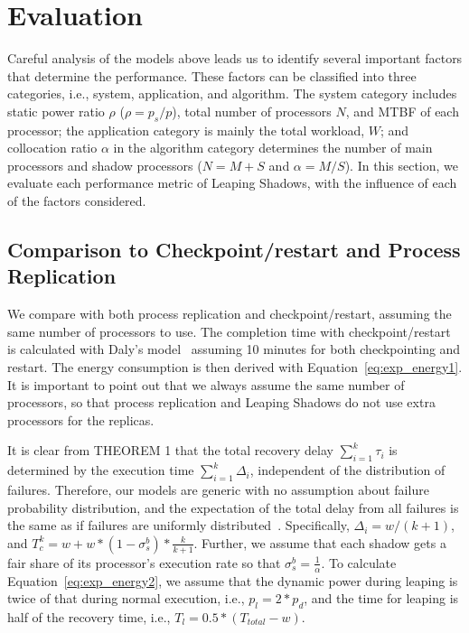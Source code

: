 \section{Evaluation}
Careful analysis of the models above leads us to identify several important factors that determine the performance. These factors can be classified into three categories, i.e., system, application, and algorithm. The system category includes static power ratio $\rho$ ($\rho=p_s/p$), total number of processors $N$, and MTBF of each processor; the application category is mainly the total workload, $W$; and collocation ratio $\alpha$ in the algorithm category determines the number of main processors and shadow processors ($N=M+S$ and $\alpha=M/S$). In this section, we evaluate each performance metric of Leaping Shadows,  with the influence of each of the factors considered. %


\subsection{Comparison to Checkpoint/restart and Process Replication}
\label{eval_comparison}
We compare with both process replication and checkpoint/restart, assuming the same number of processors to use. 
The completion time with checkpoint/restart is calculated with Daly's model~\cite{daly_fgcs_2006} assuming 10 minutes for both checkpointing and restart. The energy consumption is then derived with Equation~\ref{eq:exp_energy1}. It is important to point out that we always assume the same number of processors, so that process replication and Leaping Shadows do not use extra processors for the replicas. 

It is clear from THEOREM 1 that the total recovery delay $\sum_{i=1}^k\tau_i$ is determined by the execution time $\sum_{i=1}^k\Delta_i$, independent of the distribution of failures. 
Therefore, our models are generic with no assumption about failure probability distribution, and the expectation of the total delay from all failures is the same as if failures are uniformly distributed~\cite{daly_fgcs_2006}. Specifically, $\Delta_i = w/(k+1)$, and $T_c^k = w + w*(1-\sigma_s^b)*\frac{k}{k+1}$. Further, we assume that each shadow gets a fair share of its processor's execution rate so that $\sigma_s^b = \frac{1}{\alpha}$. 
To calculate Equation~\ref{eq:exp_energy2}, we assume that the dynamic power during leaping is twice of that during normal execution, i.e., $p_{l}=2*p_d$, and the time for leaping is half of the recovery time, i.e., $T_l=0.5*(T_{total} - w)$. 

